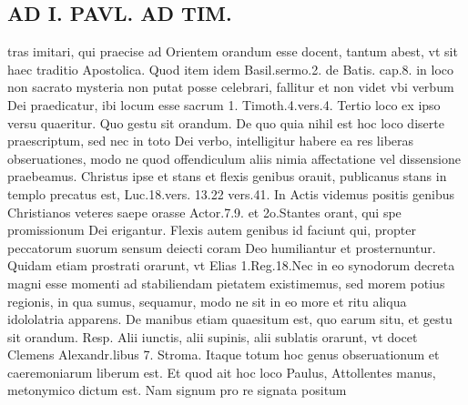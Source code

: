 \documentclass{article}
\begin{document}
\begin{pages}
\section*{AD I. PAVL. AD TIM. }
\marginpar{[ p.74 ]}\pstart tras imitari, qui praecise ad Orientem orandum esse docent, tantum abest, vt sit haec traditio Apostolica. Quod item idem Basil.sermo.2. de Batis. cap.8. in loco non sacrato mysteria non putat posse celebrari, fallitur et non videt vbi verbum Dei praedicatur, ibi locum esse sacrum 1. Timoth.4.vers.4. Tertio loco ex ipso versu quaeritur. Quo gestu sit orandum. De quo quia nihil est hoc loco diserte praescriptum, sed nec in toto Dei verbo, intelligitur habere ea res liberas obseruationes, modo ne quod offendiculum aliis nimia affectatione vel dissensione praebeamus. Christus ipse et stans et flexis genibus orauit, publicanus stans in templo precatus est, Luc.18.vers. 13.22 vers.41. In Actis videmus positis genibus Christianos veteres saepe orasse Actor.7.9. et 2o.Stantes orant, qui spe promissionum Dei erigantur. Flexis autem genibus id faciunt qui, propter peccatorum suorum sensum deiecti coram Deo humiliantur et prosternuntur. Quidam etiam prostrati orarunt, vt Elias 1.Reg.18.Nec in eo synodorum decreta magni esse momenti ad stabiliendam pietatem existimemus, sed morem potius regionis, in qua sumus, sequamur, modo ne sit in eo more et ritu aliqua idololatria apparens. De manibus etiam quaesitum est, quo earum situ, et gestu sit orandum. Resp. Alii iunctis, alii supinis, alii sublatis orarunt, vt docet Clemens Alexandr.libus 7. Stroma. Itaque totum hoc genus obseruationum et caeremoniarum liberum est. Et quod ait hoc loco Paulus, Attollentes manus, metonymico dictum est. Nam signum pro re signata positum  \pend

\end{pages}
\end{document}
